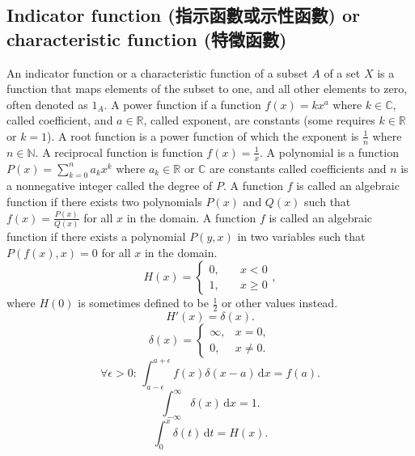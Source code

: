 \documentclass[a4paper,12pt]{report}
\begin{document}
\subsection{Indicator function (指示函數或示性函數) or characteristic function (特徵函數)}
An indicator function or a characteristic function of a subset $A$ of a set $X$ is a function that maps elements of the subset to one, and all other elements to zero, often denoted as $1_A$.
A power function if a function $f(x)=kx^a$ where $k\in\mathbb{C}$, called coefficient, and $a\in\mathbb{R}$, called exponent, are constants (some requires $k\in\mathbb{R}$ or $k=1$).
A root function is a power function of which the exponent is $\frac{1}{n}$ where $n\in\mathbb{N}$.
A reciprocal function is function $f(x)=\frac{1}{x}$.
A polynomial is a function $P(x)=\sum_{k=0}^na_kx^k$ where $a_k\in\mathbb{R}$ or $\mathbb{C}$ are constants called coefficients and $n$ is a nonnegative integer called the degree of $P$.
A function $f$ is called an algebraic function if there exists two polynomials $P(x)$ and $Q(x)$ such that $f(x)=\frac{P(x)}{Q(x)}$ for all $x$ in the domain.
A function $f$ is called an algebraic function if there exists a polynomial $P(y,x)$ in two variables such that $P(f(x),x)=0$ for all $x$ in the domain.
\[H(x)=
\begin{cases}0,\quad &x<0\\
1,\quad &x\geq 0
\end{cases},\]
where $H(0)$ is sometimes defined to be $\frac{1}{2}$ or other values instead.
\[H'(x)=\delta(x).\]
\[
\delta(x) =
\begin{cases}
\infty, & x = 0, \\
0, & x \neq 0.
\end{cases}
\]
\[
\forall \epsilon > 0:\,\int_{a-\epsilon}^{a+\epsilon} f(x) \delta(x-a) \, \mathrm{d}x = f(a).
\]
\[
\int _{-\infty }^{\infty }\delta(x) \, \mathrm{d}x = 1.
\]
\[\int_0^x\delta(t)\,\mathrm{d}t=H(x).\]
\end{document}

